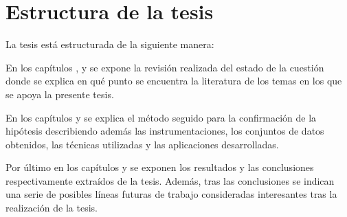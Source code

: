 \section{Estructura de la tesis}
\label{ch:intro:structure}

La tesis está estructurada de la siguiente manera:

En los capítulos ,  y  se expone la revisión realizada del estado de la cuestión donde se explica en qué punto se encuentra la literatura de los temas en los que se apoya la presente tesis.

En los capítulos  y  se explica el método seguido para la confirmación de la hipótesis describiendo además las instrumentaciones, los conjuntos de datos obtenidos, las técnicas utilizadas y las aplicaciones desarrolladas.

Por último en los capítulos  y  se exponen los resultados y las conclusiones respectivamente extraídos de la tesis. Además, tras las conclusiones se indican una serie de posibles líneas futuras de trabajo consideradas interesantes tras la realización de la tesis.
